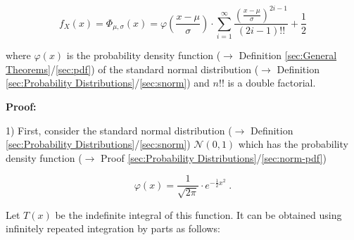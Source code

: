 \documentclass[a4paper,12pt,twoside]{book}
\begin{document}
\begin{equation} \label{eq:norm-cdfwerf-norm-cdf}
f_X(x) = \Phi_{\mu,\sigma}(x) = \varphi\left( \frac{x-\mu}{\sigma} \right) \cdot \sum_{i=1}^{\infty} \frac{\left( \frac{x-\mu}{\sigma} \right)^{2i-1}}{(2i-1)!!} + \frac{1}{2}
\end{equation}

where $\varphi(x)$ is the probability density function ($\rightarrow$ Definition \ref{sec:General Theorems}/\ref{sec:pdf}) of the standard normal distribution ($\rightarrow$ Definition \ref{sec:Probability Distributions}/\ref{sec:snorm}) and $n!!$ is a double factorial.


\vspace{1em}
\textbf{Proof:}

1) First, consider the standard normal distribution ($\rightarrow$ Definition \ref{sec:Probability Distributions}/\ref{sec:snorm}) $\mathcal{N}(0, 1)$ which has the probability density function ($\rightarrow$ Proof \ref{sec:Probability Distributions}/\ref{sec:norm-pdf})

\begin{equation} \label{eq:norm-cdfwerf-snorm-pdf}
\varphi(x) = \frac{1}{\sqrt{2 \pi}} \cdot e^{-\frac{1}{2} x^2} \; .
\end{equation}

Let $T(x)$ be the indefinite integral of this function. It can be obtained using infinitely repeated integration by parts as follows:
\end{document}
